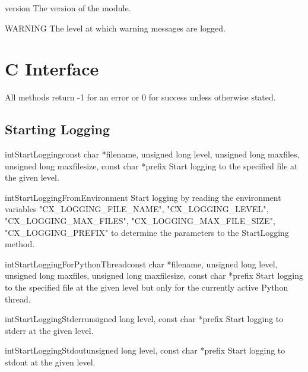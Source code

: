\documentclass{manual}
\begin{document}
\begin{datadesc}{version}
  The version of the module.
\end{datadesc}

\begin{datadesc}{WARNING}
  The level at which warning messages are logged.
\end{datadesc}

\chapter{C Interface\label{cinterface}}

All methods return -1 for an error or 0 for success unless otherwise stated.

\section{Starting Logging \label{cStartLogging}}

\begin{cfuncdesc}{int}{StartLogging}{const char *filename, unsigned long level,
        unsigned long maxfiles, unsigned long maxfilesize, const char *prefix}
  Start logging to the specified file at the given level.
\end{cfuncdesc}

\begin{cfuncdesc}{int}{StartLoggingFromEnvironment}{}
  Start logging by reading the environment variables "CX_LOGGING_FILE_NAME",
  "CX_LOGGING_LEVEL", "CX_LOGGING_MAX_FILES", "CX_LOGGING_MAX_FILE_SIZE",
  "CX_LOGGING_PREFIX" to determine the parameters to the StartLogging method.
\end{cfuncdesc}

\begin{cfuncdesc}{int}{StartLoggingForPythonThread}{const char *filename,
        unsigned long level, unsigned long maxfiles, unsigned long maxfilesize,
        const char *prefix}
  Start logging to the specified file at the given level but only for the
  currently active Python thread.
\end{cfuncdesc}

\begin{cfuncdesc}{int}{StartLoggingStderr}{unsigned long level,
        const char *prefix}
  Start logging to stderr at the given level.
\end{cfuncdesc}

\begin{cfuncdesc}{int}{StartLoggingStdout}{unsigned long level,
        const char *prefix}
  Start logging to stdout at the given level.
\end{cfuncdesc}
\end{document}
